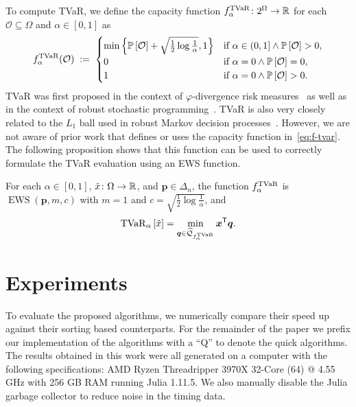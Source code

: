 \documentclass[10pt]{article} %
\DeclareMathOperator{\ews}{EWS}
\renewcommand{\cite}{\citep}
\begin{document}
To compute TVaR, we define the capacity function $f_{\alpha}^{\operatorname{TVaR}}\colon 2^{\Omega } \to \mathbb{R}$  for each $\mathcal{O} \subseteq \Omega$ and $\alpha \in [0,1]$ as
\begin{equation}\label{eq:f-tvar}
  f^{\operatorname{TVaR}}_{\alpha}(\mathcal{O})
    \; :=\; 
      \begin{cases}
        \min\left\{\mathbb{P}\left[ \mathcal{O} \right] + \sqrt{\frac{1}{2} \log \frac{1}{\alpha}}, 1\right\} &\text{if } \alpha \in (0,1] \wedge \mathbb{P}\left[ \mathcal{O} \right] > 0, \\
        0 & \text{if } \alpha = 0 \wedge \mathbb{P}\left[ \mathcal{O} \right] = 0, \\
        1 & \text{if } \alpha = 0 \wedge \mathbb{P}\left[ \mathcal{O} \right] > 0.
      \end{cases}
\end{equation}
TVaR was first proposed in the context of $\varphi$-divergence risk measures~\cite{Kruse2021} as well as in the context of robust stochastic programming~\cite{Shapiro2017}. TVaR is also very closely related to the $L_1$ ball used in robust Markov decision processes~\cite{Ho2021,Ho2022}. However, we are not aware of prior work that defines or uses the capacity function in~\eqref{eq:f-tvar}. The following proposition shows that this function can be used to correctly formulate the TVaR evaluation using an EWS function. 
\begin{proposition} \label{prop:tvar-ews-correct}
For each $\alpha\in [0,1]$, $\tilde{x} \colon \Omega \to \mathbb{R}$, and $\bm{p} \in \Delta_n$, the function $f^{\operatorname{TVaR}}_{\alpha }$ is $\ews(\bm{p}, m, c)$ with $m = 1$ and $c = \sqrt{\frac{1}{2}  \log \frac{1}{\alpha}}$, and
\begin{equation} \label{eq:tvar-correct}
  \operatorname{TVaR}_{\alpha} \left[\tilde{x} \right] = \min_{\bm{q}\in \widehat{\mathcal{Q}}_{f_{\alpha}^{\operatorname{TVaR}}}} \bm{x}^{\mathsf{T}} \bm{q}.
\end{equation}
\end{proposition}

\section{Experiments}\label{sec:experiments}

To evaluate the proposed algorithms, we numerically compare their speed up against their sorting based counterparts. For the remainder of the paper we prefix our implementation of the algorithms with a ``Q'' to denote the quick algorithms. The results obtained in this work were all generated on a computer with the following specifications: AMD Ryzen Threadripper 3970X 32-Core (64) @ 4.55 GHz with 256 GB RAM running Julia 1.11.5. We also manually disable the Julia garbage collector to reduce noise in the timing data.
\end{document}
